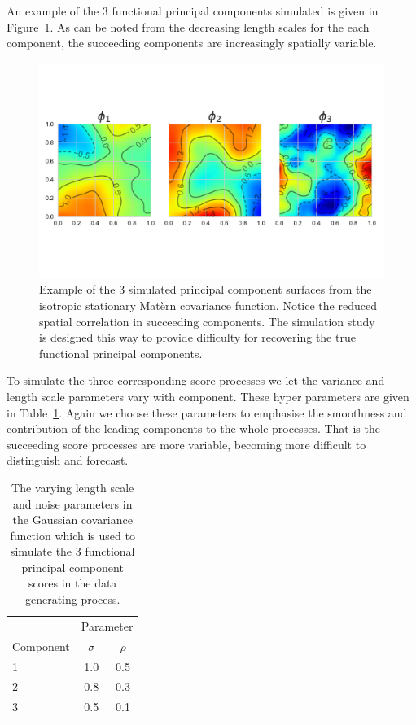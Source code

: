 An example of the $3$ functional principal components simulated is given in Figure~\ref{fig:ftsm_example_fpc}.
As can be noted from the decreasing length scales for the each component, the succeeding components are increasingly spatially variable.

\begin{figure}[htbp!] 
	\centering    
	\includegraphics[width=1.0\textwidth]{sim_fpc_example}
	\caption[Example functional principle component simulation]{Example of the 3 simulated principal component surfaces from the isotropic stationary Mat\`{e}rn covariance function. Notice the reduced spatial correlation in succeeding components. The simulation study is designed this way to provide difficulty for recovering the true functional principal components. }
	\label{fig:ftsm_example_fpc}
\end{figure}

To simulate the three corresponding score processes we let the variance and length scale parameters vary with component.
These hyper parameters are given in Table~\ref{tab:zeta_params}.
Again we choose these parameters to emphasise the smoothness  and contribution of the leading components to the whole processes.
That is the succeeding score processes are more variable, becoming more difficult to distinguish and forecast. 

\begin{table}[htbp!] 
	\caption[Parameters for simulating functional principal component score processes]{The varying length scale and noise parameters in the Gaussian covariance function which is used to simulate the $3$ functional principal component scores in the data generating process.}
	\centering
	\label{tab:zeta_params}
	\begin{tabular}{l c c }
		\toprule
		& \multicolumn{2}{c}{Parameter} \\ 
		Component  & $\sigma$ &$\rho$ \\
		\midrule
		1 & 1.0 & 0.5 \\
		2 & 0.8 & 0.3 \\
		3 & 0.5 & 0.1 \\
		\bottomrule
	\end{tabular}
\end{table}

